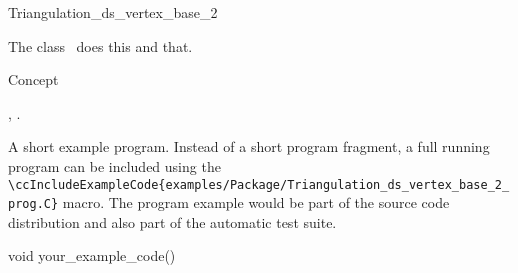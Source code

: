 

\begin{ccRefClass}{Triangulation_ds_vertex_base_2}  %


\ccDefinition
  
The class \ccRefName\ does this and that.


\ccIsModel

Concept

\ccTypes


\ccCreation
{}  %


\ccOperations


\ccSeeAlso

,
.

\ccExample

A short example program.
Instead of a short program fragment, a full running program can be
included using the 
\verb|\ccIncludeExampleCode{examples/Package/Triangulation_ds_vertex_base_2_prog.C}| 
macro. The program example would be part of the source code distribution and
also part of the automatic test suite.

\begin{ccExampleCode}
void your_example_code() {
}
\end{ccExampleCode}


\end{ccRefClass}



